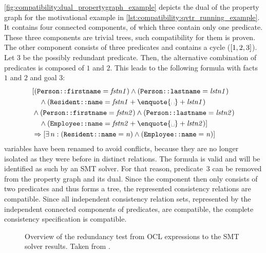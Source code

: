 \begin{example}
\autoref{fig:compatibility:dual_propertygraph_example} depicts the dual of the property graph for the motivational example in \autoref{lst:compatibility:qvtr_running_example}. 
It contains four connected components, of which three contain only one predicate. 
These three components are trivial trees, such compatibility for them is proven.
The other component consists of three predicates and contains a cycle ($[1, 2, 3]$).
Let $3$ be the possibly redundant predicate.
Then, the alternative combination of predicates is composed of $1$ and $2$. 
This leads to the following formula with facts $1$ and $2$ and goal $3$:
\begin{align*}
    &
        [(\propdisplay{Person::firstname} = \mathvariable{fstn1}) \land (\propdisplay{Person::lastname} = \mathvariable{lstn1})\\
    &
        \formulaskip \land (\propdisplay{Resident::name} = \mathvariable{fstn1} + \text{\enquote{\textvisiblespace}} + \mathvariable{lstn1}) \\%
    & 
        \land %
            (\propdisplay{Person::firstname} = \mathvariable{fstn2}) \land (\propdisplay{Person::lastname} = \mathvariable{lstn2})\\
    &
        \formulaskip \land (\propdisplay{Employee::name} = \mathvariable{fstn2} + \text{\enquote{\textvisiblespace}} + \mathvariable{lstn2})]\\
    & 
        \Rightarrow
        [\exists n : (\propdisplay{Resident::name} = \mathvariable{n}) \land (\propdisplay{Employee::name} = \mathvariable{n})]
\end{align*}
\qvtr variables have been renamed to avoid conflicts, because they are no longer isolated as they were before in distinct \qvtr relations.
The formula is valid and will be identified as such by an \gls{SMT} solver.
For that reason, predicate~$3$ can be removed from the property graph and its dual. 
Since the component then only consists of two predicates and thus forms a tree, the represented consistency relations are compatible.
Since all independent consistency relation sets, represented by the independent connected components of predicates, are compatible, the complete consistency specification is compatible.
\end{example}

\begin{figure}
    \centering
    
    \caption[Redundancy test overview]{Overview of the redundancy test from \gls{OCL} expressions to the \gls{SMT} solver results. Taken from .}
    \label{fig:compatibility:redundancytest}
\end{figure}

